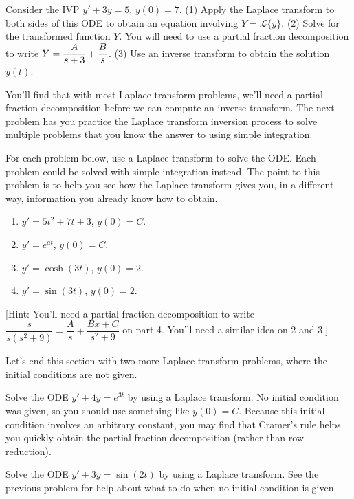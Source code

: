 \begin{problem}
 Consider the IVP $y'+3y=5$, $y(0)=7$.  (1) Apply the Laplace transform to both sides of this ODE to obtain an equation involving $Y=\mathscr{L}\{y\}$. (2) Solve for the transformed function $Y$. You will need to use a partial fraction decomposition to write $\displaystyle Y = \frac{A}{s+3}+\frac{B}{s}$. (3) Use an inverse transform to obtain the solution $y(t)$.  
\end{problem}

You'll find that with most Laplace transform problems, we'll need a partial fraction decomposition before we can compute an inverse transform. The next problem has you practice the Laplace transform inversion process to solve multiple problems that you know the answer to using simple integration.

\begin{problem}
 For each problem below, use a Laplace transform to solve the ODE. Each problem could be solved with simple integration instead. The point to this problem is to help you see how the Laplace transform gives you, in a different way, information you already know how to obtain.
\begin{enumerate}
 \item $y'=5t^2+7t+3$, $y(0)=C$.
 \item $y'=e^{at}$, $y(0)=C$.
 \item $y'=\cosh(3 t)$, $y(0)=2$.
 \item $y'=\sin(3 t)$, $y(0)=2$.
\end{enumerate}
[Hint:  You'll need a partial fraction decomposition to write $\dfrac{s}{s(s^2+9)} = \dfrac{A}{s}+\dfrac{Bx+C}{s^2+9}$ on part 4.  You'll need a similar idea on 2 and 3.]
\end{problem}

Let's end this section with two more Laplace transform problems, where the initial conditions are not given.

\begin{problem}
 Solve the ODE $y'+4y = e^{3t}$ by using a Laplace transform. No initial condition was given, so you should use something like $y(0)=C$. Because this initial condition involves an arbitrary constant, you may find that Cramer's rule helps you quickly obtain the partial fraction decomposition (rather than row reduction).
\end{problem}

\begin{problem}
 Solve the ODE $y'+3y = \sin(2t)$ by using a Laplace transform. See the previous problem for help about what to do when no initial condition is given. 
\end{problem}


